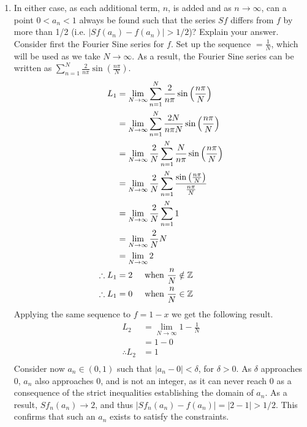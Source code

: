\documentclass[a4paper]{article}
\newcommand{\ds}{\displaystyle}
\begin{document}
\begin{enumerate}
\begin{enumerate}
		\item In either case, as each additional term, $\ds{n}$, is added and as $\ds{n \rightarrow \infty}$, can a point $\ds{0 < a_n < 1}$ always be found such that the series $\ds{Sf}$ differs from $\ds{f}$ by more than 1/2 (i.e. $\ds{|Sf(a_n) - f(a_n)| > 1/2}$)? Explain your answer.
		\bigbreak
		Consider first the Fourier Sine series for $\ds{f}$. Set up the sequence $\ds{=\frac{1}{N}}$, which will be used as we take $\ds{N\rightarrow\infty}$. As a result, the Fourier Sine series can be written as $\ds{\sum^{N}_{n=1}\frac{2}{n\pi}\sin\left(\frac{n\pi}{N}\right)}$. 
		\begin{align*}
			L_1 & = \lim_{N\rightarrow\infty}{\sum^{N}_{n=1}\frac{2}{n\pi}\sin\left(\frac{n\pi}{N}\right)}\\
			& = \lim_{N\rightarrow\infty}{\sum^{N}_{n=1}\frac{2N}{n\pi N}\sin\left(\frac{n\pi}{N}\right)}\\
			& = \lim_{N\rightarrow\infty}{\frac{2}{N}\sum^{N}_{n=1}\frac{N}{n\pi}\sin\left(\frac{n\pi}{N}\right)}\\
			& = \lim_{N\rightarrow\infty}{\frac{2}{N}\sum^{N}_{n=1}\frac{\sin\left(\frac{n\pi}{N}\right)}{\frac{n\pi}{N}}}\\
			& = \lim_{N\rightarrow\infty}{\frac{2}{N}\sum^{N}_{n=1}1}\\
			& = \lim_{N\rightarrow\infty}{\frac{2}{N}N}\\
			& = \lim_{N\rightarrow\infty}{2}\\
			\therefore L_1 & = 2 \hspace{5mm} \text{when } \frac{n}{N} \notin \mathbb{Z}\\
			\therefore L_1 & = 0 \hspace{5mm} \text{when } \frac{n}{N} \in \mathbb{Z}\\
		\end{align*}
		Applying the same sequence to $\ds{f=1-x}$ we get the following result.
		\begin{align*}
			L_2 & = \lim_{N\rightarrow\infty}{1-\frac{1}{N}}\\
			& = 1-0\\
			\therefore L_2 & = 1\\
		\end{align*}
		Consider now $\ds{a_n \in (0,1)}$ such that $\ds{|a_n - 0| < \delta}$, for $\ds{\delta > 0}$. As $\ds{\delta}$ approaches 0, $\ds{a_n}$ also approaches 0, and is not an integer, as it can never reach 0 as a consequence of the strict inequalities establishing the domain of $\ds{a_n}$. As a result, $\ds{Sf_n(a_n)\rightarrow2}$, and thus $\ds{|Sf_n(a_n) - f(a_n)| = |2 - 1| > 1/2}$. This confirms that such an $\ds{a_n}$ exists to satisfy the constraints.

\end{enumerate}
\end{enumerate}
\end{document}
